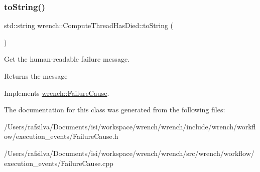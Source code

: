 \subsubsection{\texorpdfstring{to\+String()}{toString()}}
{\footnotesize\ttfamily std\+::string wrench\+::\+Compute\+Thread\+Has\+Died\+::to\+String (\begin{DoxyParamCaption}{ }\end{DoxyParamCaption})\hspace{0.3cm}{\ttfamily [virtual]}}



Get the human-\/readable failure message. 

\begin{DoxyReturn}{Returns}
the message 
\end{DoxyReturn}


Implements \hyperlink{classwrench_1_1_failure_cause_afbad248ebe902409f2cd4f1d6f2b867d}{wrench\+::\+Failure\+Cause}.



The documentation for this class was generated from the following files\+:\begin{DoxyCompactItemize}
\item 
/\+Users/rafsilva/\+Documents/isi/workspace/wrench/wrench/include/wrench/workflow/execution\+\_\+events/Failure\+Cause.\+h\item 
/\+Users/rafsilva/\+Documents/isi/workspace/wrench/wrench/src/wrench/workflow/execution\+\_\+events/Failure\+Cause.\+cpp\end{DoxyCompactItemize}
